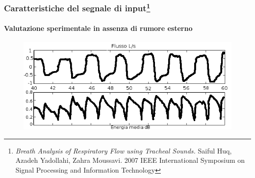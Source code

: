 \begin{frame}[t]
  \frametitle{Caratteristiche del segnale di input\footnote{\emph{Breath Analysis of Respiratory Flow using Tracheal Sounds.} Saiful Huq, Azadeh Yadollahi, Zahra Moussavi. 2007 IEEE International Symposium on Signal Processing and Information Technology}}
  \framesubtitle{Valutazione sperimentale in assenza di rumore esterno}
\begin{center}
\begin{figure}
 \includegraphics[width=\textwidth]{./ba2.png}
\end{figure}
\end{center}
\end{frame}

% 
% 
% 
% 
% 

